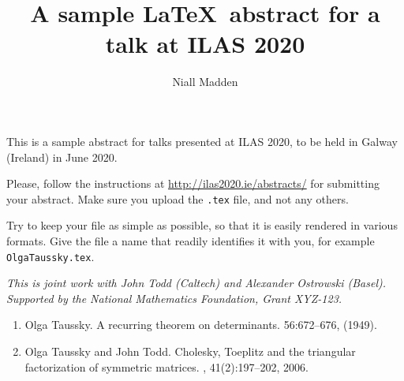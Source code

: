 \documentclass[a4paper]{amsart}
\date{}
\makeatletter
\def\labelenumi{\theenumi.}
\def\theenumi{\@arabic\c@enumi}
\makeatother
\begin{document}
\title{A sample \LaTeX\ abstract for a talk at ILAS 2020}
\author{Niall Madden} %
\address{University of Wherever} %

\maketitle


This is a sample abstract for talks presented at ILAS 2020, to be held
in Galway (Ireland) in June 2020. 

Please, follow the instructions at \url{http://ilas2020.ie/abstracts/}
for submitting your abstract. Make sure you upload the \texttt{.tex}
file, and not any others. 

Try to keep your file as simple as possible, so that it is easily
rendered in various formats. Give the file a name that readily
identifies it with you, for example \texttt{OlgaTaussky.tex}. 

\emph{This is joint work with John Todd (Caltech) and Alexander Ostrowski (Basel).
Supported by the National Mathematics Foundation, Grant XYZ-123.}


\makeatletter %
\def\labelenumi{[\theenumi]}
\def\theenumi{\@arabic\c@enumi}
\makeatother

\begin{enumerate}
\item
Olga Taussky.
\newblock A recurring theorem on determinants.
  56:672–676,  (1949).

\item
Olga Taussky and John Todd.
\newblock Cholesky, Toeplitz and the triangular factorization of
symmetric matrices.
, 41(2):197--202, 2006.
\end{enumerate}
\end{document}
